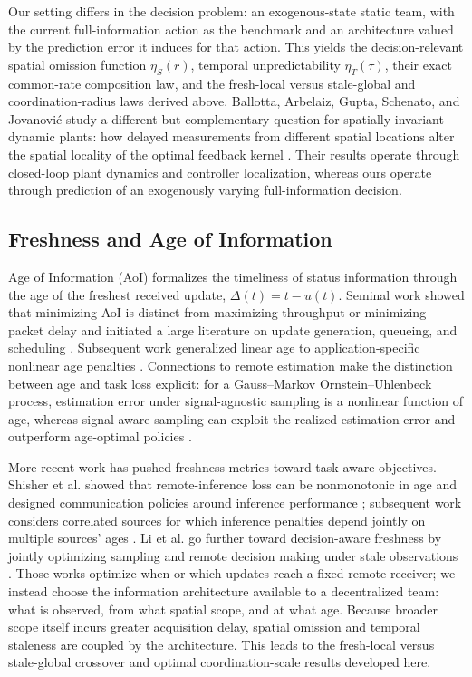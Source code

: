 \documentclass[11pt]{article}
\begin{document}
Our setting differs in the decision problem: an exogenous-state static team,
with the current full-information action as the benchmark and an architecture
valued by the prediction error it induces for that action. This yields the
decision-relevant spatial omission function $\eta_S(r)$, temporal
unpredictability $\eta_T(\tau)$, their exact common-rate composition law, and
the fresh-local versus stale-global and coordination-radius laws derived above.
Ballotta, Arbelaiz, Gupta, Schenato, and Jovanovi\'c study a different but
complementary question for spatially invariant dynamic plants: how delayed
measurements from different spatial locations alter the spatial locality of the
optimal feedback kernel \cite{ballotta2026role}. Their results operate through
closed-loop plant dynamics and controller localization, whereas ours operate
through prediction of an exogenously varying full-information decision.

\subsection{Freshness and Age of Information}

Age of Information (AoI) formalizes the timeliness of status information through the age of the freshest received update, $\Delta(t)=t-u(t)$. Seminal work showed that minimizing AoI is distinct from maximizing throughput or minimizing packet delay and initiated a large literature on update generation, queueing, and scheduling \cite{kaul2012realtime,yates2021aoi}. Subsequent work generalized linear age to application-specific nonlinear age penalties \cite{sun2017update}. Connections to remote estimation make the distinction between age and task loss explicit: for a Gauss--Markov Ornstein--Uhlenbeck process, estimation error under signal-agnostic sampling is a nonlinear function of age, whereas signal-aware sampling can exploit the realized estimation error and outperform age-optimal policies \cite{ornee2021ou}.

More recent work has pushed freshness metrics toward task-aware objectives. Shisher et al. showed that remote-inference loss can be nonmonotonic in age and designed communication policies around inference performance \cite{shisher2024timely}; subsequent work considers correlated sources for which inference penalties depend jointly on multiple sources' ages \cite{shisher2026correlated}. Li et al. go further toward decision-aware freshness by jointly optimizing sampling and remote decision making under stale observations \cite{li2026freshness}. Those works optimize when or which updates reach a fixed remote receiver; we instead choose the information architecture available to a decentralized team: what is observed, from what spatial scope, and at what age. Because broader scope itself incurs greater acquisition delay, spatial omission and temporal staleness are coupled by the architecture. This leads to the fresh-local versus stale-global crossover and optimal coordination-scale results developed here.
\end{document}
